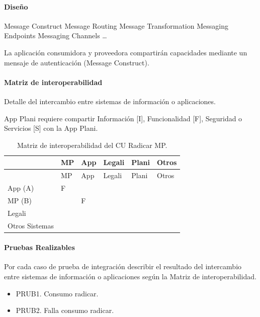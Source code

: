 \documentclass[
  paper=a4,
  ,captions=tableheading
]{scrartcl}
\providecommand{\tightlist}{%
  \setlength{\itemsep}{0pt}\setlength{\parskip}{0pt}}
\begin{document}
\paragraph{Diseño}\label{sec:diseuxf1o-3}

Message Construct \textbar{} Message Routing \textbar{} Message
Transformation \textbar{} Messaging Endpoints \textbar{} Messaging
Channels \textbar{} \ldots{}

La aplicación consumidora y proveedora compartirán capacidades mediante
un mensaje de autenticación (Message Construct).

\paragraph{Matriz de
interoperabilidad}\label{sec:matriz-de-interoperabilidad-3}

Detalle del intercambio entre sistemas de información o aplicaciones.

App Plani requiere compartir Información {[}I{]}, Funcionalidad {[}F{]},
Seguridad o Servicios {[}S{]} con la App Plani.

\begin{longtable}[]{@{}llllll@{}}
\caption{Matriz de interoperabilidad del CU Radicar MP.}\tabularnewline
\toprule\noalign{}
& MP & App & Legali & Plani & Otros \\
\midrule\noalign{}
\endfirsthead
\toprule\noalign{}
& MP & App & Legali & Plani & Otros \\
\midrule\noalign{}
\endhead
\bottomrule\noalign{}
\endlastfoot
App (A) & F & & & & \\
MP (B) & & F & & & \\
Legali & & & & & \\
Otros Sistemas & & & & & \\
\end{longtable}

\paragraph{Pruebas Realizables}\label{sec:pruebas-realizables-3}

Por cada caso de prueba de integración describir el resultado del
intercambio entre sistemas de información o aplicaciones según la Matriz
de interoperabilidad.

\begin{itemize}
\tightlist
\item
  PRUB1. Consumo radicar.
\item
  PRUB2. Falla consumo radicar.
\end{itemize}
\end{document}
